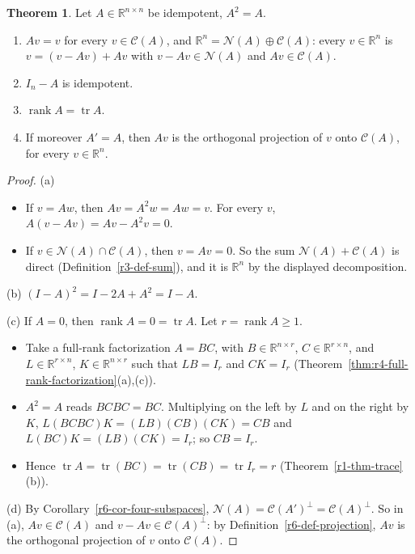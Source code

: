 \documentclass[12pt]{article}
\newcommand{\R}{\mathbb R}
\DeclareMathOperator{\tr}{tr}
\DeclareMathOperator{\rank}{rank}
\theoremstyle{definition}
\newtheorem{theorem}{Theorem}
\begin{document}
\begin{theorem}\label{r6-thm-idempotent}
Let \(A\in\R^{n\times n}\) be idempotent, \(A^2=A\).
\begin{enumerate}
\item \(Av=v\) for every \(v\in\mathcal C(A)\), and \(\R^n=\mathcal N(A)\oplus\mathcal C(A)\): every \(v\in\R^n\) is
\(v=(v-Av)+Av\) with \(v-Av\in\mathcal N(A)\) and \(Av\in\mathcal C(A)\).
\item \(I_n-A\) is idempotent.
\item \(\rank A=\tr A\).
\item If moreover \(A'=A\), then \(Av\) is the orthogonal projection of \(v\) onto \(\mathcal C(A)\), for every
\(v\in\R^n\).
\end{enumerate}
\end{theorem}
\begin{proof}
(a)
\begin{itemize}
\item If \(v=Aw\), then \(Av=A^2w=Aw=v\). For every \(v\), \(A(v-Av)=Av-A^2v=0\).
\item If \(v\in\mathcal N(A)\cap\mathcal C(A)\), then \(v=Av=0\). So the sum \(\mathcal N(A)+\mathcal C(A)\) is direct
(Definition~\ref{r3-def-sum}), and it is \(\R^n\) by the displayed decomposition.
\end{itemize}
(b) \((I-A)^2=I-2A+A^2=I-A\).

(c) If \(A=0\), then \(\rank A=0=\tr A\). Let \(r=\rank A\geqslant1\).
\begin{itemize}
\item Take a full-rank factorization \(A=BC\), with \(B\in\R^{n\times r}\), \(C\in\R^{r\times n}\), and
\(L\in\R^{r\times n}\), \(K\in\R^{n\times r}\) such that \(LB=I_r\) and \(CK=I_r\)
(Theorem~\ref{thm:r4-full-rank-factorization}(a),(c)).
\item \(A^2=A\) reads \(BCBC=BC\). Multiplying on the left by \(L\) and on the right by \(K\),
\(L(BCBC)K=(LB)(CB)(CK)=CB\) and \(L(BC)K=(LB)(CK)=I_r\); so \(CB=I_r\).
\item Hence \(\tr A=\tr(BC)=\tr(CB)=\tr I_r=r\) (Theorem~\ref{r1-thm-trace}(b)).
\end{itemize}
(d) By Corollary~\ref{r6-cor-four-subspaces}, \(\mathcal N(A)=\mathcal C(A')^\perp=\mathcal C(A)^\perp\). So in (a),
\(Av\in\mathcal C(A)\) and \(v-Av\in\mathcal C(A)^\perp\): by Definition~\ref{r6-def-projection}, \(Av\) is the
orthogonal projection of \(v\) onto \(\mathcal C(A)\).
\end{proof}
\end{document}
